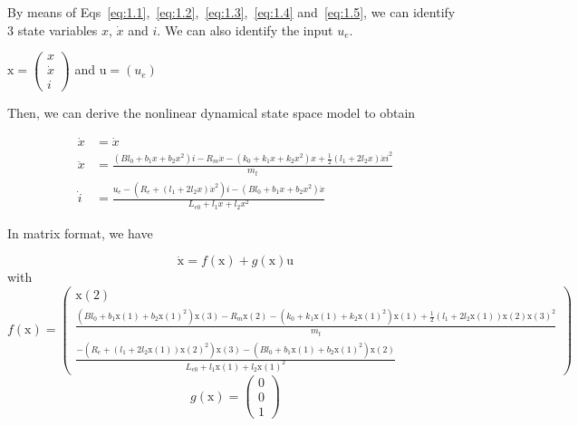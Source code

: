 By means of Eqs~\ref{eq:1.1},~\ref{eq:1.2},~\ref{eq:1.3},~\ref{eq:1.4} and~\ref{eq:1.5}, we can identify 3 state variables $x$,  $\dot{x}$ and $i$. We can also identify the input $u_e$.

$\text{x}=\begin{pmatrix}
   x \\
   \dot{x} \\
	 i
\end{pmatrix}$ and $\text{u}=(u_e)$

Then, we can derive the nonlinear dynamical state space model to obtain

\begin{align}
   \dot{x} &= \dot{x}\\
	 \ddot{x} &= \frac{(Bl_0+b_1x+b_2x^2)i-R_m\dot{x}-(k_0+k_1x+k_2x^2)x+\frac{1}{2}(l_1+2l_2x)\dot{x}i^2}{m_t}\\
	 \dot{i} &= \frac{u_e-(R_e+(l_1+2l_2x)\dot{x}^2)i-(Bl_0+b_1x+b_2x^2)\dot{x}}{L_{e0}+l_1x+l_2x^2}
\end{align}

In matrix format, we have

\begin{equation}
	\label{eq:eqModel}
	\dot{\text{x}}=f(\text{x})+g(\text{x})\text{u}
\end{equation}
with
\begin{equation}
	\label{eq:f(x)}
	f(\text{x})=\begin{pmatrix}
   \text{x}(2) \\
	 \frac{(Bl_0+b_1\text{x}(1)+b_2\text{x}(1)^2)\text{x}(3)-R_m\text{x}(2)-(k_0+k_1\text{x}(1)+k_2\text{x}(1)^2)\text{x}(1)+\frac{1}{2}(l_1+2l_2\text{x}(1))\text{x}(2)\text{x}(3)^2}{m_t}\\
	 \frac{-(R_e+(l_1+2l_2\text{x}(1))\text{x}(2)^2)\text{x}(3)-(Bl_0+b_1\text{x}(1)+b_2\text{x}(1)^2)\text{x}(2)}{L_{e0}+l_1\text{x}(1)+l_2\text{x}(1)^2}
\end{pmatrix}
\end{equation}
\begin{equation}
	\label{eq:g(u)}
	g(\text{x})=\begin{pmatrix}
   0\\
   0 \\
	 1
\end{pmatrix}
\end{equation}
